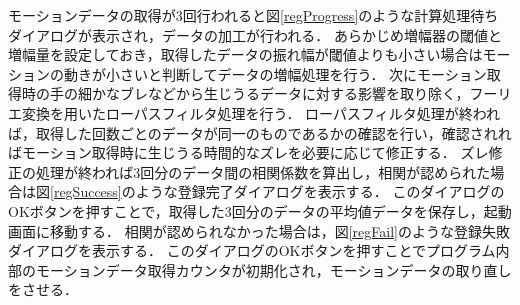 \documentclass[11pt]{jreport}
\begin{document}
        モーションデータの取得が3回行われると図\ref{regProgress}のような計算処理待ちダイアログが表示され，データの加工が行われる．
        あらかじめ増幅器の閾値と増幅量を設定しておき，取得したデータの振れ幅が閾値よりも小さい場合はモーションの動きが小さいと判断してデータの増幅処理を行う．
        次にモーション取得時の手の細かなブレなどから生じうるデータに対する影響を取り除く，フーリエ変換を用いたローパスフィルタ処理を行う．
        ローパスフィルタ処理が終われば，取得した回数ごとのデータが同一のものであるかの確認を行い，確認されればモーション取得時に生じうる時間的なズレを必要に応じて修正する．
        ズレ修正の処理が終われば3回分のデータ間の相関係数を算出し，相関が認められた場合は図\ref{regSuccess}のような登録完了ダイアログを表示する．
        このダイアログのOKボタンを押すことで，取得した3回分のデータの平均値データを保存し，起動画面に移動する．
        相関が認められなかった場合は，図\ref{regFail}のような登録失敗ダイアログを表示する．
        このダイアログのOKボタンを押すことでプログラム内部のモーションデータ取得カウンタが初期化され，モーションデータの取り直しをさせる．
\end{document}
